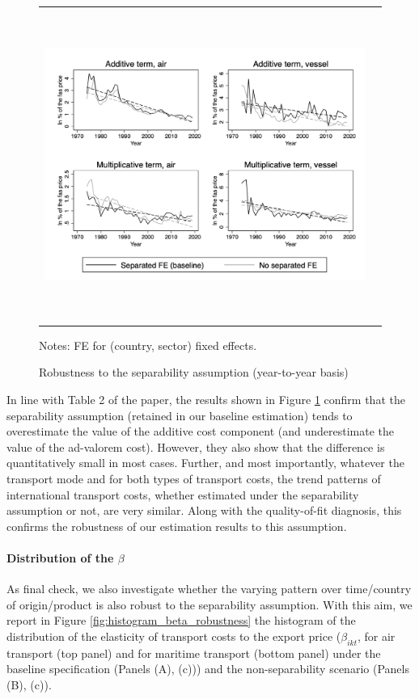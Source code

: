\documentclass[11pt,twoside, authoryear]{elsarticle}
\begin{document}
\begin{figure}[htbp]
\caption{Robustness to the separability assumption (year-to-year basis)}
\label{fig:robustesse_non_separe}
\begin{center}
\begin{tabular}{cc}
\includegraphics[width=6in, height=4in]{graph_robustesse_ns.jpg}

\end{tabular}
\end{center}
\begin{minipage} [c]  {5in} \scriptsize%
Notes: FE for (country, sector) fixed effects.
\end{minipage}
\end{figure}

In line with Table 2 of the paper, the results shown in Figure \ref{fig:robustesse_non_separe} confirm that the separability assumption (retained in our baseline estimation) tends to overestimate the value of the additive cost component (and underestimate the value of the ad-valorem cost).
However, they also show that the difference is quantitatively small in most cases. Further, and most importantly, whatever the transport mode and for both types of transport costs, the trend patterns of international transport costs, whether estimated under the separability assumption or not, are very similar. Along with the quality-of-fit diagnosis, this confirms the robustness of our estimation results to this assumption.


\paragraph{Distribution of the $\beta$} As final check, we also investigate whether the varying pattern over time/country of origin/product is also robust to the separability assumption. With this aim, we report in Figure \ref{fig:histogram_beta_robustness}
the histogram of the distribution of the elasticity of transport costs to the export price ($\beta_{ikt}$, for air transport (top panel) and for maritime transport (bottom panel) under the baseline specification (Panels (A), (c))) and the non-separability scenario (Panels (B), (c)).
\end{document}
